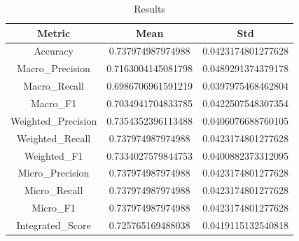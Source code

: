 \begin{table}[htbp]
\centering
\caption{Results}
\label{tab:csv}
\small
\setlength{\tabcolsep}{4pt}
\begin{tabular}{|c|c|c|}
\hline
Metric & Mean & Std \\
\hline
Accuracy & 0.737974987974988 & 0.0423174801277628 \\
Macro_Precision & 0.7163004145081798 & 0.0489291374379178 \\
Macro_Recall & 0.6986706961591219 & 0.0397975468462804 \\
Macro_F1 & 0.7034941704833785 & 0.0422507548307354 \\
Weighted_Precision & 0.7354352396113488 & 0.0406076688760105 \\
Weighted_Recall & 0.737974987974988 & 0.0423174801277628 \\
Weighted_F1 & 0.7334027579844753 & 0.0400882373312095 \\
Micro_Precision & 0.737974987974988 & 0.0423174801277628 \\
Micro_Recall & 0.737974987974988 & 0.0423174801277628 \\
Micro_F1 & 0.737974987974988 & 0.0423174801277628 \\
Integrated_Score & 0.725765169488038 & 0.0419115132540818 \\
\hline
\end{tabular}
\end{table}